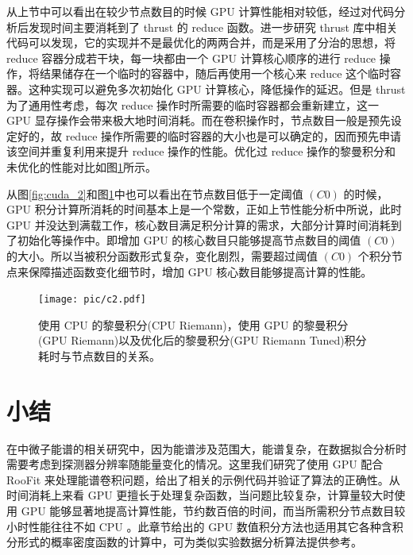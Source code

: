 从上节中可以看出在较少节点数目的时候 GPU 计算性能相对较低，经过对代码分析后发现时间主要消耗到了 thrust 的 reduce 函数。进一步研究 thrust 库中相关代码可以发现，它的实现并不是最优化的两两合并，而是采用了分治的思想，将 reduce 容器分成若干块，每一块都由一个 GPU 计算核心顺序的进行 reduce 操作，将结果储存在一个临时的容器中，随后再使用一个核心来 reduce 这个临时容器。这种实现可以避免多次初始化 GPU 计算核心，降低操作的延迟。但是 thrust 为了通用性考虑，每次 reduce 操作时所需要的临时容器都会重新建立，这一 GPU 显存操作会带来极大地时间消耗。而在卷积操作时，节点数目一般是预先设定好的，故 reduce 操作所需要的临时容器的大小也是可以确定的，因而预先申请该空间并重复利用来提升 reduce 操作的性能。优化过 reduce 操作的黎曼积分和未优化的性能对比如图\ref{fig:cuda_3}所示。

从图\ref{fig:cuda_2}和图\ref{fig:cuda_3}中也可以看出在节点数目低于一定阈值 $(C0)$ 的时候，GPU 积分计算所消耗的时间基本上是一个常数，正如上节性能分析中所说，此时 GPU 并没达到满载工作，核心数目满足积分计算的需求，大部分计算时间消耗到了初始化等操作中。即增加 GPU 的核心数目只能够提高节点数目的阈值 $(C0)$ 的大小。所以当被积分函数形式复杂，变化剧烈，需要超过阈值 $(C0)$ 个积分节点来保障描述函数变化细节时，增加 GPU 核心数目能够提高计算的性能。 

\begin{figure}[htb]
    \centering
    \texttt{[image: pic/c2.pdf]}
    \caption{ 使用 CPU 的黎曼积分(CPU Riemann)，使用 GPU 的黎曼积分(GPU Riemann)以及优化后的黎曼积分(GPU Riemann Tuned)积分耗时与节点数目的关系。}
    \label{fig:cuda_3}
\end{figure}

\section{小结}

在中微子能谱的相关研究中，因为能谱涉及范围大，能谱复杂，在数据拟合分析时需要考虑到探测器分辨率随能量变化的情况。这里我们研究了使用 GPU 配合 RooFit 来处理能谱卷积问题，给出了相关的示例代码并验证了算法的正确性。从时间消耗上来看 GPU 更擅长于处理复杂函数，当问题比较复杂，计算量较大时使用 GPU 能够显著地提高计算性能，节约数百倍的时间，而当所需积分节点数目较小时性能往往不如 CPU 。此章节给出的 GPU 数值积分方法也适用其它各种含积分形式的概率密度函数的计算中，可为类似实验数据分析算法提供参考。